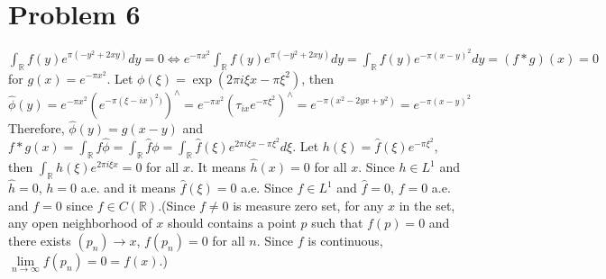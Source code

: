 \documentclass{article}
\DeclareMathOperator{\rr}{\mathbb{R}}
\begin{document}
\section*{Problem 6}
$\int_{\rr} f(y)e^{\pi(-y^2+2xy)}dy=0 \Leftrightarrow e^{-\pi x^2}\int_{\rr} f(y)e^{\pi(-y^2+2xy)}dy=\int_{\rr} f(y)e^{-\pi(x-y)^2}dy= \left(f*g\right)(x)=0$ for $g(x)=e^{-\pi x^2}$. Let $\phi(\xi)=\exp(2\pi i \xi x-\pi \xi^2)$, then
\begin{equation*}
\hat{\phi}(y)=e^{-\pi x^2}\left(e^{-\pi(\xi-ix)^2)}\right)^\wedge=e^{-\pi x^2}\left(\tau_{ix}e^{-\pi\xi^2}\right)^\wedge = e^{-\pi(x^2-2yx+y^2)}=e^{-\pi(x-y)^2}
\end{equation*}
Therefore, $\hat{\phi}(y)=g(x-y)$ and $f*g(x)=\int_{\rr}f\hat{\phi}=\int_{\rr}\hat{f}\phi=\int_{\rr}\hat{f}(\xi)e^{2\pi i \xi x-\pi \xi^2}d\xi$. Let $h(\xi)=\hat{f}(\xi)e^{-\pi\xi^2}$, then $\int_{\rr}h(\xi)e^{2\pi i \xi x}=0$ for all $x$. It means $\hat{h}(x)=0$ for all $x$. Since $h\in L^1$ and $\hat{h}=0$, $h=0$ a.e. and it means $\hat{f}(\xi)=0$ a.e. Since $f\in L^1$ and $\hat{f}=0$, $f=0$ a.e. and $f = 0$ since $f\in C(\mathbb{R})$.(Since $f\neq 0$ is measure zero set, for any $x$ in the set, any open neighborhood of $x$ should contains a point $p$ such that $f(p)=0$ and there exists $(p_n)\rightarrow x$, $f(p_n)=0$ for all $n$. Since $f$ is continuous, $\lim\limits_{n\rightarrow \infty} f(p_n)=0=f(x)$.)
\end{document}
